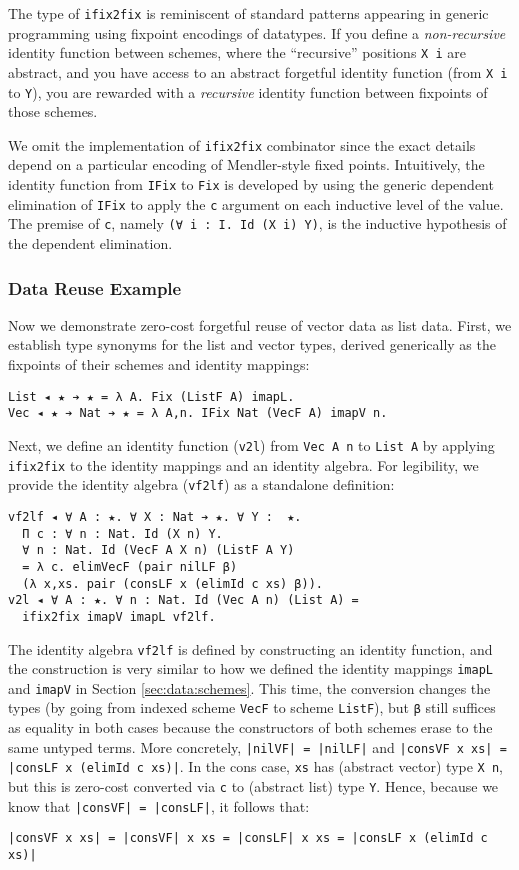 \documentclass[acmsmall,screen]{acmart}
\newcommand{\refsec}[1]{Section \ref{sec:#1}}
\begin{document}
The type of \verb;ifix2fix; is reminiscent of standard patterns
appearing in generic programming using fixpoint encodings of
datatypes. If you define a \textit{non-recursive}
identity function between schemes, where the
``recursive'' positions \verb;X i; are abstract, and you have access to an
abstract forgetful identity function (from \verb;X i; to \verb;Y;),
you are rewarded with a \textit{recursive}
identity function between fixpoints of those schemes.

We omit the implementation of \verb;ifix2fix; combinator since the
exact details depend on a particular encoding of Mendler-style fixed
points. Intuitively, the identity function from \verb;IFix; to
\verb;Fix; is developed by using the generic dependent elimination of
\verb;IFix; to apply the \verb;c; argument on each inductive level of
the value. The premise of \verb;c;, namely
\verb;(∀ i : I. Id (X i) Y);, is the inductive hypothesis of the
dependent elimination.

\subsubsection{Data Reuse Example}

Now we demonstrate zero-cost forgetful reuse of vector data as list
data. First, we establish type synonyms for the list and vector types,
derived generically as the fixpoints of their schemes and identity
mappings:
\begin{verbatim}
List ◂ ★ ➔ ★ = λ A. Fix (ListF A) imapL.
Vec ◂ ★ ➔ Nat ➔ ★ = λ A,n. IFix Nat (VecF A) imapV n.
\end{verbatim}
Next, we define an identity function (\verb;v2l;) from
\verb;Vec A n; to \verb;List A; by applying
\verb;ifix2fix; to the identity mappings and an
identity algebra. For legibility, we provide the identity algebra
(\verb;vf2lf;) as a standalone definition:
\begin{verbatim}
vf2lf ◂ ∀ A : ★. ∀ X : Nat ➔ ★. ∀ Y :  ★. 
  Π c : ∀ n : Nat. Id (X n) Y.
  ∀ n : Nat. Id (VecF A X n) (ListF A Y)
  = λ c. elimVecF (pair nilLF β)
  (λ x,xs. pair (consLF x (elimId c xs) β)).
v2l ◂ ∀ A : ★. ∀ n : Nat. Id (Vec A n) (List A) =
  ifix2fix imapV imapL vf2lf. 
\end{verbatim}
The identity algebra \verb;vf2lf; is defined by constructing an
identity function, and the construction is very similar to how we
defined the identity mappings \verb;imapL; and \verb;imapV; in
\refsec{data:schemes}. This time, the conversion changes the types (by going
from indexed scheme \verb;VecF; to scheme \verb;ListF;), but \verb;β;
still suffices as equality in both cases because the constructors of
both schemes erase to the same untyped terms. More concretely,
\verb;|nilVF| = |nilLF|; and
\verb;|consVF x xs| = |consLF x (elimId c xs)|;. In the cons case,
\verb;xs; has (abstract vector) type \verb;X n;, but this is zero-cost
converted via \verb;c; to (abstract list) type \verb;Y;. Hence,
because we know that \verb;|consVF| = |consLF|;, it follows that:
\begin{verbatim}
|consVF x xs| = |consVF| x xs = |consLF| x xs = |consLF x (elimId c xs)|
\end{verbatim}
\end{document}

